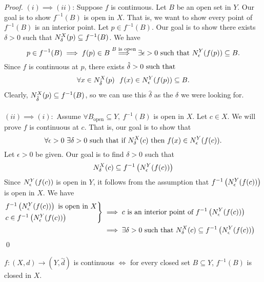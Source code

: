 \begin{proof}
    $(i) \implies (ii)$: Suppose $f$ is continuous. Let $B$ be an open set in $Y$. Our goal is to show $f^{-1}(B)$ is open in $X$. That is, we want to show every point of $f^{-1}(B)$ is an interior point. Let $p \in f^{-1}(B).$ Our goal is to show there exists $\delta > 0$ such that $N_{\delta}^{X}(p) \subseteq f^{-1}(B)$. We have
    $$p \in f^{-1}(B) \implies f(p) \in B \overset{B \text{ is open}}{\implies} \exists \epsilon > 0 \text{ such that } N_{\epsilon}^{Y}(f(p)) \subseteq B.$$
    Since $f$ is continuous at $p$, there exists $\hat{\delta} > 0 \text{ such that }$
    $$\forall x \in N_{\hat{\delta}}^{X}(p) ~~f(x) \in N_{\epsilon}^{Y}(f(p)) \subseteq B.$$
    Clearly, $N_{\hat{\delta}}^{X}(p) \subseteq f^{-1}(B)$, so we can use this $\hat{\delta}$ as the $\delta$ we were looking for. \\ \\
    $(ii) \implies (i):$ Assume $\forall B_{\text{open}} \subseteq Y, ~f^{-1}(B)$ is open in $X$. Let $c\in X$. We will prove $f$ is continuous at $c$. That is, our goal is to show that 
    $$\forall \epsilon > 0 ~\exists \delta > 0 \text{ such that } \text{if $N_{\delta}^{X}(c)$ then $f(x) \in N_{\epsilon}^{Y}(f(c))$.}$$
    Let $\epsilon > 0$ be given. Our goal is to find $\delta > 0$ such that
    \begin{equation*}
        N_{\delta}^{X}(c) \subseteq f^{-1}\left(N_{\epsilon}^{Y}(f(c))\right)
    \end{equation*}
    Since $N_{\epsilon}^{Y}(f(c))$ is open in $Y$, it follows from the assumption that $f^{-1}\left(N_{\epsilon}^{Y}(f(c))\right)$ is open in $X$. We have
    \begin{align*}
        \begin{rcases*}
            f^{-1}\left(\nbhds{\epsilon}{Y}{f(c)}\right) \text{ is open in $X$} \\
            c \in f^{-1}\left(\nbhds{\epsilon}{Y}{f(c)}\right)
        \end{rcases*} &\implies c \text{ is an interior point of } f^{-1}\left(\nbhds{\epsilon}{Y}{f(c)}\right) \\
        &\implies \exists \delta > 0 \st \nbhds{\delta}{X}{c} \subseteq f^{-1}\left(\nbhds{\epsilon}{Y}{f(c)}\right)
    \end{align*}
    \qed
\end{proof}

\begin{remark}
    $f:(X,d) \to (Y, \overset{\sim}{d})$ is continuous $\iff$ for every closed set $B \subseteq Y$, $f^{-1}(B)$ is closed in $X$.
\end{remark}

